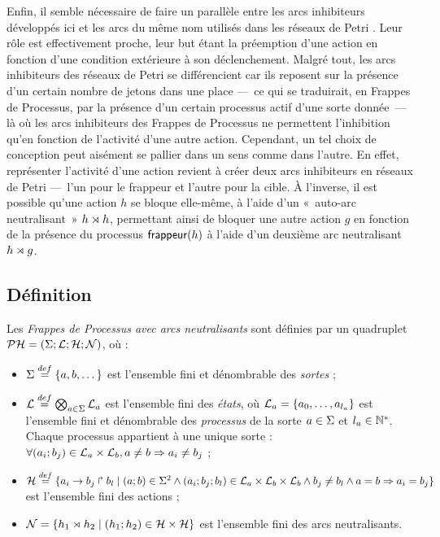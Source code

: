Enfin, il semble nécessaire de faire un parallèle entre les arcs inhibiteurs développés ici
et les arcs du même nom utilisés dans les réseaux de Petri \toref.
Leur rôle est effectivement proche, leur but étant la préemption d'une action en fonction
d'une condition extérieure à son déclenchement.
Malgré tout, les arcs inhibiteurs des réseaux de Petri se différencient car ils
reposent sur la présence d'un certain nombre de jetons dans une place
---~ce qui se traduirait, en Frappes de Processus,
par la présence d'un certain processus actif d'une sorte donnée~---
là où les arcs inhibiteurs des Frappes de Processus ne permettent l'inhibition
qu'en fonction de l'activité d'une autre action.
Cependant, un tel choix de conception peut aisément se pallier dans un sens comme dans l'autre.
En effet, représenter l'activité d'une action revient à créer deux arcs inhibiteurs en
réseaux de Petri ---~l'un pour le frappeur et l'autre pour la cible.
À l'inverse, il est possible qu'une action $h$ se bloque elle-même, à l'aide d'un 
«~auto-arc neutralisant~» $h\rtimes h$,
permettant ainsi de bloquer une autre action $g$
en fonction de la présence du processus $\mathsf{frappeur}(h)$
à l'aide d'un deuxième arc neutralisant $h\rtimes g$.


\subsection{Définition}

\begin{definition}
  Les \emph{Frappes de Processus avec arcs neutralisants} sont définies par
  un quadruplet $\mathcal{PH} = (\Sigma ; \mathcal{L} ; \mathcal{H} ; \mathcal{N})$, où :
  \begin{itemize}
    \item $\Sigma \stackrel{def}= \{a, b, \dots\}$ est l'ensemble fini et dénombrable des \emph{sortes} ;
    \item $\mathcal{L} \stackrel{def}= \bigotimes_{a \in \Sigma} \mathcal{L}_a$ est l'ensemble fini des \emph{états},
      où $\mathcal{L}_a = \{a_0, \ldots, a_{l_a}\}$ est l'ensemble fini et dénombrable
      des \emph{processus} de la sorte $a \in \Sigma$ et $l_a \in \mathbb{N}^*$.
      Chaque processus appartient à une unique sorte :
      $\forall (a_i; b_j) \in \mathcal{L}_a \times \mathcal{L}_b, a \neq b \Rightarrow a_i \neq b_j$ ;
    \item $\mathcal{H} \stackrel{def}= \{a_i\rightarrow b_j\Rsh b_l \mid (a; b) \in \Sigma^2 \wedge
      (a_i; b_j; b_l) \in \mathcal{L}_a \times \mathcal{L}_b \times \mathcal{L}_b \wedge
      b_j \neq b_l \wedge a = b \Rightarrow a_i = b_j \}$ est l'ensemble fini des actions ;
    \item $\mathcal{N} = \{h_1\rtimes h_2 \mid (h_1 ; h_2) \in \mathcal{H} \times \mathcal{H}\}$
      est l'ensemble fini des arcs neutralisants.
  \end{itemize}
\end{definition}

